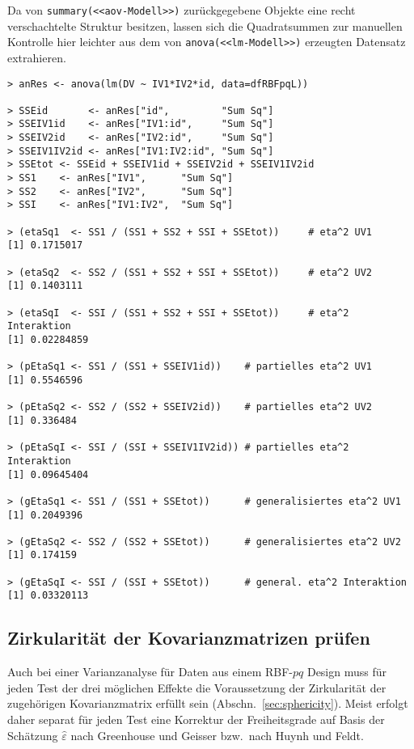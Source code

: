 Da von \lstinline!summary(<<aov-Modell>>)! zurückgegebene Objekte eine recht verschachtelte Struktur besitzen, lassen sich die Quadratsummen zur manuellen Kontrolle hier leichter aus dem von \lstinline!anova(<<lm-Modell>>)! erzeugten Datensatz extrahieren.
\begin{lstlisting}
> anRes <- anova(lm(DV ~ IV1*IV2*id, data=dfRBFpqL))

> SSEid       <- anRes["id",         "Sum Sq"]
> SSEIV1id    <- anRes["IV1:id",     "Sum Sq"]
> SSEIV2id    <- anRes["IV2:id",     "Sum Sq"]
> SSEIV1IV2id <- anRes["IV1:IV2:id", "Sum Sq"]
> SSEtot <- SSEid + SSEIV1id + SSEIV2id + SSEIV1IV2id
> SS1    <- anRes["IV1",      "Sum Sq"]
> SS2    <- anRes["IV2",      "Sum Sq"]
> SSI    <- anRes["IV1:IV2",  "Sum Sq"]

> (etaSq1  <- SS1 / (SS1 + SS2 + SSI + SSEtot))     # eta^2 UV1
[1] 0.1715017

> (etaSq2  <- SS2 / (SS1 + SS2 + SSI + SSEtot))     # eta^2 UV2
[1] 0.1403111

> (etaSqI  <- SSI / (SS1 + SS2 + SSI + SSEtot))     # eta^2 Interaktion
[1] 0.02284859

> (pEtaSq1 <- SS1 / (SS1 + SSEIV1id))    # partielles eta^2 UV1
[1] 0.5546596

> (pEtaSq2 <- SS2 / (SS2 + SSEIV2id))    # partielles eta^2 UV2
[1] 0.336484

> (pEtaSqI <- SSI / (SSI + SSEIV1IV2id)) # partielles eta^2 Interaktion
[1] 0.09645404

> (gEtaSq1 <- SS1 / (SS1 + SSEtot))      # generalisiertes eta^2 UV1
[1] 0.2049396

> (gEtaSq2 <- SS2 / (SS2 + SSEtot))      # generalisiertes eta^2 UV2
[1] 0.174159

> (gEtaSqI <- SSI / (SSI + SSEtot))      # general. eta^2 Interaktion
[1] 0.03320113
\end{lstlisting}

\subsection{Zirkularität der Kovarianzmatrizen prüfen}

Auch bei einer Varianzanalyse für Daten aus einem RBF-$pq$ Design muss für jeden Test der drei möglichen Effekte die Voraussetzung der Zirkularität der zugehörigen Kovarianzmatrix erfüllt sein (Abschn.\ \ref{sec:sphericity}). Meist erfolgt daher separat für jeden Test eine Korrektur der Freiheitsgrade auf Basis der Schätzung $\hat{\varepsilon}$ nach Greenhouse und Geisser bzw.\ nach Huynh und Feldt.

